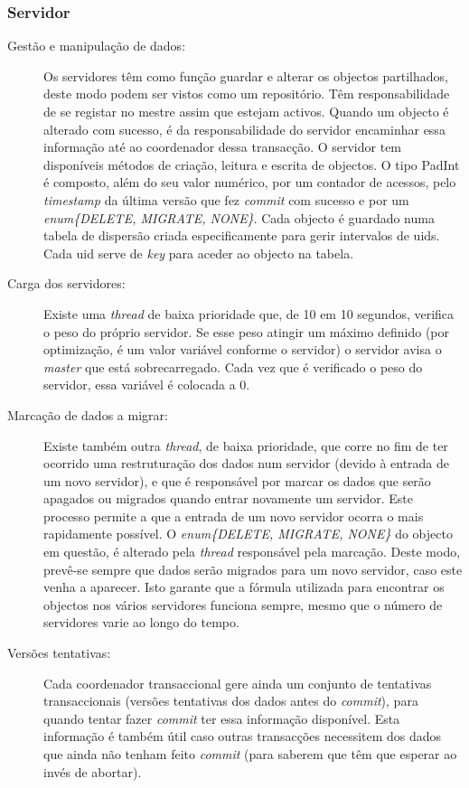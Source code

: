 \subsubsection{Servidor}

\begin{description}

\item[Gestão e manipulação de dados:]
Os servidores têm como função guardar e alterar os objectos partilhados, deste modo podem ser vistos como um repositório. Têm responsabilidade de se registar no mestre assim que estejam activos. Quando um objecto é alterado com sucesso, é da responsabilidade do servidor encaminhar essa informação até ao coordenador dessa transacção. O servidor tem disponíveis métodos de criação, leitura e escrita de objectos. O tipo PadInt é composto, além do seu valor numérico, por um contador de acessos, pelo \textit{timestamp} da última versão que fez \textit{commit} com sucesso e por um \textit{enum\{DELETE, MIGRATE, NONE\}}. Cada objecto é guardado numa  tabela de dispersão criada especificamente para gerir intervalos de uids. Cada uid serve de \textit{key} para aceder ao objecto na tabela.

\item[Carga dos servidores:]
Existe uma \textit{thread} de baixa prioridade que, de 10 em 10 segundos, verifica o peso do próprio servidor. Se esse peso atingir um máximo definido (por optimização, é um valor variável conforme o servidor) o servidor avisa o \textit{master} que está sobrecarregado. Cada vez que é verificado o peso do servidor, essa variável é colocada a 0.

\item[Marcação de dados a migrar:]
Existe também outra \textit{thread}, de baixa prioridade, que corre no fim de ter ocorrido uma restruturação dos dados num servidor (devido à entrada de um novo servidor), e que é responsável por marcar os dados que serão apagados ou migrados quando entrar novamente um servidor. Este processo permite a que a entrada de um novo servidor ocorra o mais rapidamente possível. O \textit{enum\{DELETE, MIGRATE, NONE\}} do objecto em questão, é alterado pela \textit{thread} responsável pela marcação. Deste modo, prevê-se sempre que dados serão migrados para um novo servidor, caso este venha a aparecer. Isto garante que a fórmula utilizada para encontrar os objectos nos vários servidores funciona sempre, mesmo que o número de servidores varie ao longo do tempo.

\item[Versões tentativas:]
Cada coordenador transaccional gere ainda um conjunto de tentativas transaccionais (versões tentativas dos dados antes do \textit{commit}), para quando tentar fazer \textit{commit} ter essa informação disponível. Esta informação é também útil caso outras transacções necessitem dos dados que ainda não tenham feito \textit{commit} (para saberem que têm que esperar ao invés de abortar).


\end{description}
